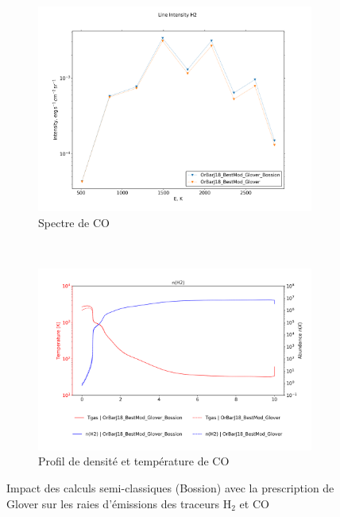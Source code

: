 \begin{figure}[h!]
    \centering
    \begin{subfigure}[t]{0.45\textwidth} %
        \centering \includegraphics[trim = {0 0 0 1.5cm},clip,width=1\textwidth]{figure/H2/GloverBossion/I_comp_H2.png}
        \caption{Spectre de $\mathrm{CO}$}
    \end{subfigure}
    ~ 
    \begin{subfigure}[t]{0.45\textwidth}
        \centering \includegraphics[trim = {0 0 0 1.5cm},clip,width=1\textwidth]{figure/H2/GloverBossion/nT_comp_H2.png}
        \caption{Profil de densité et température de $\mathrm{CO}$}
    \end{subfigure}
    \caption{Impact des calculs semi-classiques (Bossion) avec la prescription de Glover sur les raies d'émissions des traceurs $\mathrm{H}_2$ et $\mathrm{CO}$}
    \label{fig:H2:GloverBossion:emiss}
\end{figure}


